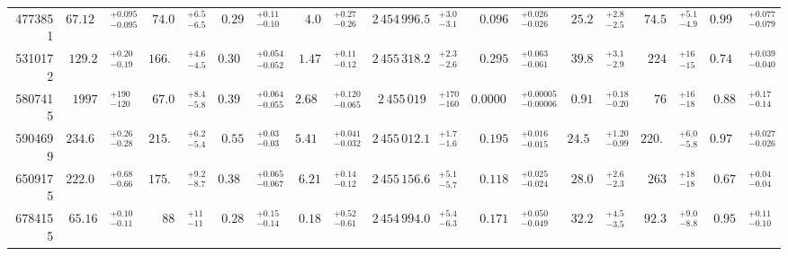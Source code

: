 \documentclass[a4paper,fleqn,usenatbib]{mnras}
\begin{document}
\begin{table*}
\begin{tabular}{r r@{}l r@{}l r@{}l r@{}l r@{}l r@{}l r@{}l r@{}l r@{}l}
\vspace{1.5mm}
4773851 & $67.129$&$^{+0.095}_{-0.095}$ & $74.0$&$^{+6.5}_{-6.5}$ & $0.29$&$^{+0.11}_{-0.10}$ & $4.0$&$^{+0.27}_{-0.26}$ & $2\,454\,996.5$&$^{+3.0}_{-3.1}$ & $0.096$&$^{+0.026}_{-0.026}$ & $25.2$&$^{+2.8}_{-2.5}$ & $74.5$&$^{+5.1}_{-4.9}$ & $0.993$&$^{+0.077}_{-0.079}$ \\
\vspace{1.5mm}
5310172 & $129.2$&$^{+0.20}_{-0.19}$ & $166.1$&$^{+4.6}_{-4.5}$ & $0.304$&$^{+0.054}_{-0.052}$ & $1.47$&$^{+0.11}_{-0.12}$ & $2\,455\,318.2$&$^{+2.3}_{-2.6}$ & $0.295$&$^{+0.063}_{-0.061}$ & $39.8$&$^{+3.1}_{-2.9}$ & $224$&$^{+16}_{-15}$ & $0.741$&$^{+0.039}_{-0.040}$ \\
\vspace{1.5mm}
5807415 & $1997$&$^{+190}_{-120}$ & $67.0$&$^{+8.4}_{-5.8}$ & $0.394$&$^{+0.064}_{-0.055}$ & $2.687$&$^{+0.120}_{-0.065}$ & $2\,455\,019$&$^{+170}_{-160}$ & $0.00008$&$^{+0.00005}_{-0.00006}$ & $0.91$&$^{+0.18}_{-0.20}$ & $76$&$^{+16}_{-18}$ & $0.88$&$^{+0.17}_{-0.14}$ \\
\vspace{1.5mm}
5904699 & $234.68$&$^{+0.26}_{-0.28}$ & $215.5$&$^{+6.2}_{-5.4}$ & $0.55$&$^{+0.03}_{-0.03}$ & $5.411$&$^{+0.041}_{-0.032}$ & $2\,455\,012.1$&$^{+1.7}_{-1.6}$ & $0.195$&$^{+0.016}_{-0.015}$ & $24.57$&$^{+1.20}_{-0.99}$ & $220.8$&$^{+6.0}_{-5.8}$ & $0.976$&$^{+0.027}_{-0.026}$ \\
\vspace{1.5mm}
6509175 & $222.01$&$^{+0.68}_{-0.66}$ & $175.4$&$^{+9.2}_{-8.7}$ & $0.389$&$^{+0.065}_{-0.067}$ & $6.21$&$^{+0.14}_{-0.12}$ & $2\,455\,156.6$&$^{+5.1}_{-5.7}$ & $0.118$&$^{+0.025}_{-0.024}$ & $28.0$&$^{+2.6}_{-2.3}$ & $263$&$^{+18}_{-18}$ & $0.67$&$^{+0.04}_{-0.04}$ \\
\vspace{1.5mm}
6784155 & $65.16$&$^{+0.10}_{-0.11}$ & $88$&$^{+11}_{-11}$ & $0.28$&$^{+0.15}_{-0.14}$ & $0.18$&$^{+0.52}_{-0.61}$ & $2\,454\,994.0$&$^{+5.4}_{-6.3}$ & $0.171$&$^{+0.050}_{-0.049}$ & $32.2$&$^{+4.5}_{-3.5}$ & $92.3$&$^{+9.0}_{-8.8}$ & $0.95$&$^{+0.11}_{-0.10}$ \\
\bottomrule
\end{tabular}
\end{table*}
\end{document}
